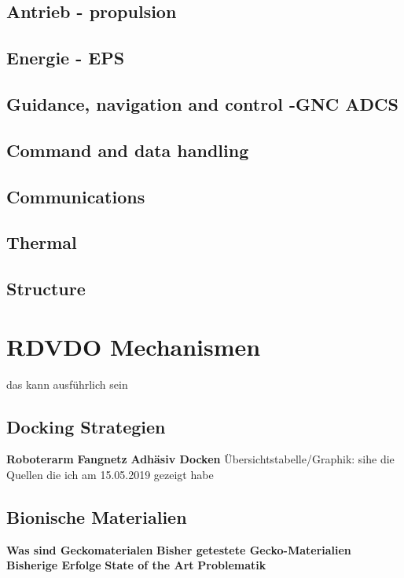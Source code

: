 		\subsection{Antrieb - propulsion}
		\subsection{Energie - EPS}
		\subsection{Guidance, navigation and control -GNC ADCS}
		\subsection{Command and data handling}
		\subsection{Communications}
		\subsection{Thermal}
		\subsection{Structure}
				
	\section{RDVDO Mechanismen} das kann ausführlich sein
		\subsection{Docking Strategien}
						\textbf{Roboterarm}
						\textbf{Fangnetz}
						\textbf{Adhäsiv Docken}
						Übersichtstabelle/Graphik: sihe die Quellen die ich am 15.05.2019 gezeigt habe
		\subsection{Bionische Materialien}
						\textbf{Was sind Geckomaterialen}
						\textbf{Bisher getestete Gecko-Materialien}
						\textbf{Bisherige Erfolge}
						\textbf{State of the Art}
						\textbf{Problematik}